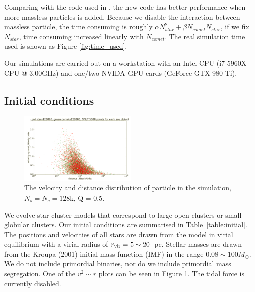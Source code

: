 \documentclass[usenatbib]{mn2e}
\newcommand{\rvir}{r_{\rm vir}}
\newcommand{\msun}{M_\odot}
\begin{document}
Comparing with the code used in \citep{Wang:2015ab}, the new code has better performance when more massless particles is added. Because we disable the interaction between massless particle, the time consuming is roughly $\alpha N_{star}^{2}+\beta N_{comet} N_{star}$, if we fix $N_{star}$, time consuming increased linearly with $N_{comet}$. The real simulation time used is shown as Figure \ref{fig:time_used}.


Our simulations are carried out on a workstation with an Intel CPU (i7-5960X CPU @ 3.00GHz) and one/two NVIDA GPU cards (GeForce GTX 980 Ti).

\subsection{Initial conditions}

\begin{figure}
  \centering
  \includegraphics[width=0.5\textwidth,height=!]{v2_r.png}
  \caption{The velocity and distance distribution of particle in the simulation, $N_{s} = N_{c} = 128$k, Q = 0.5.}
  \label{fig:v2_r}
\end{figure}

We evolve star cluster models that correspond to large open clusters or small globular clusters. Our initial conditions are summarised in Table~\ref{table:initial}. 
The positions and velocities of all stars are drawn from the \cite{Plummer:1911aa} model in virial equilibrium with a virial radius of $\rvir=5 \sim 20$~pc. Stellar masses are drawn from the Kroupa (2001) initial mass function (IMF) in the range $0.08 \sim100\msun$. 
We do not include primordial binaries, nor do we include primordial mass segregation. One of the $v^{2} \sim r$ plots can be seen in Figure \ref{fig:v2_r}. The tidal force is currently disabled. %
\end{document}
